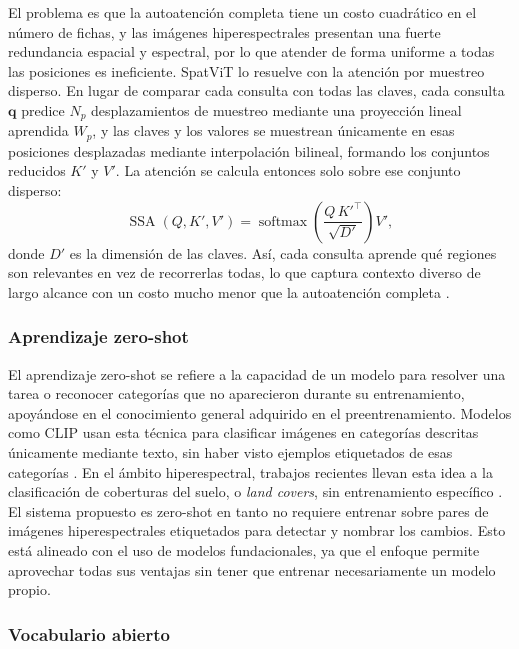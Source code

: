 El problema es que la autoatención completa tiene un costo cuadrático en el número de fichas, y las imágenes hiperespectrales presentan una fuerte redundancia espacial y espectral, por lo que atender de forma uniforme a todas las posiciones es ineficiente. SpatViT lo resuelve con la atención por muestreo disperso. En lugar de comparar cada consulta con todas las claves, cada consulta $\mathbf{q}$ predice $N_p$ desplazamientos de muestreo mediante una proyección lineal aprendida $W_p$, y las claves y los valores se muestrean únicamente en esas posiciones desplazadas mediante interpolación bilineal, formando los conjuntos reducidos $K'$ y $V'$. La atención se calcula entonces solo sobre ese conjunto disperso:
\begin{equation}
\operatorname{SSA}(Q,K',V')=\operatorname{softmax}\!\left(\frac{Q\,K'^{\top}}{\sqrt{D'}}\right)V',
\end{equation}
donde $D'$ es la dimensión de las claves. Así, cada consulta aprende qué regiones son relevantes en vez de recorrerlas todas, lo que captura contexto diverso de largo alcance con un costo mucho menor que la autoatención completa \parencite{wang2024hypersigma}.

\subsubsection{Aprendizaje zero-shot}

El aprendizaje zero-shot se refiere a la capacidad de un modelo para resolver una tarea o reconocer categorías que no aparecieron durante su entrenamiento, apoyándose en el conocimiento general adquirido en el preentrenamiento. Modelos como CLIP usan esta técnica para clasificar imágenes en categorías descritas únicamente mediante texto, sin haber visto ejemplos etiquetados de esas categorías \parencite{radford2021clip}. En el ámbito hiperespectral, trabajos recientes llevan esta idea a la clasificación de coberturas del suelo, o \textit{land covers}, sin entrenamiento específico \parencite{pang2025special}. El sistema propuesto es zero-shot en tanto no requiere entrenar sobre pares de imágenes hiperespectrales etiquetados para detectar y nombrar los cambios. Esto está alineado con el uso de modelos fundacionales, ya que el enfoque permite aprovechar todas sus ventajas sin tener que entrenar necesariamente un modelo propio.

\subsubsection{Vocabulario abierto}

